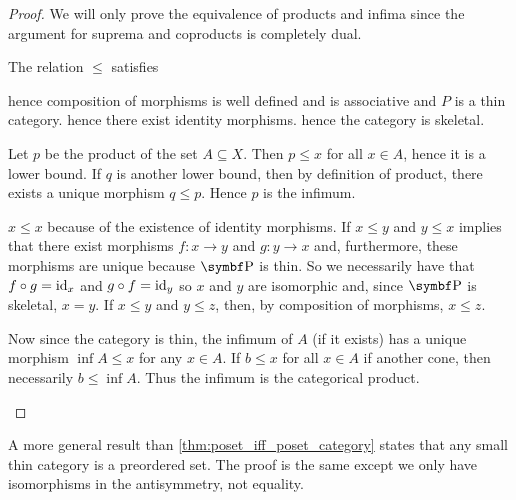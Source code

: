 \begin{proof}
  We will only prove the equivalence of products and infima since the argument for suprema and coproducts is completely dual.

  \begin{description}
    \Implies The relation \( \leq \) satisfies
    \begin{description}
       hence composition of morphisms is well defined and is associative and \( P \) is a thin category.
       hence there exist identity morphisms.
       hence the category is skeletal.
    \end{description}

    Let \( p \) be the product of the set \( A \subseteq X \). Then \( p \leq x \) for all \( x \in A \), hence it is a lower bound. If \( q \) is another lower bound, then by definition of product, there exists a unique morphism \( q \leq p \). Hence \( p \) is the infimum.

    \ImpliedBy\mbox{}
    \begin{description}
       \( x \leq x \) because of the existence of identity morphisms.
       If \( x \leq y \) and \( y \leq x \) implies that there exist morphisms \( f: x \to y \) and \( g: y \to x \) and, furthermore, these morphisms are unique because \( \Bold{P} \) is thin. So we necessarily have that \( f \circ g = \operatorname{id}_x \) and \( g \circ f = \operatorname{id}_y \) so \( x \) and \( y \) are isomorphic and, since \( \Bold{P} \) is skeletal, \( x = y \).
       If \( x \leq y \) and \( y \leq z \), then, by composition of morphisms, \( x \leq z \).
    \end{description}

    Now since the category is thin, the infimum of \( A \) (if it exists) has a unique morphism \( \inf A \leq x \) for any \( x \in A \). If \( b \leq x \) for all \( x \in A \) if another cone, then necessarily \( b \leq \inf A \). Thus the infimum is the categorical product.
  \end{description}
\end{proof}

\begin{note}\label{note:small_thin_category_isomorphic_to_preorder}
  A more general result than \cref{thm:poset_iff_poset_category} states that any small thin category is a preordered set. The proof is the same except we only have isomorphisms in the antisymmetry, not equality.
\end{note}

